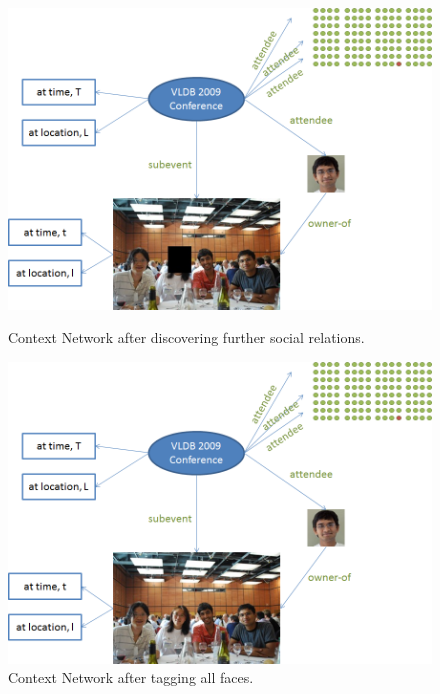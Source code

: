 \begin{figure}[h]
\begin{minipage}[b]{0.5\linewidth}
\centering
\includegraphics[width=\textwidth]{media/chapter4/stacktrace/vldb-network-7.png}
\caption{Context Network after discovering further social relations.}
\label{fig:vldb-network-7}
\end{minipage}
\hspace{0.5cm}
\begin{minipage}[b]{0.5\linewidth}
\centering
\includegraphics[width=\textwidth]{media/chapter4/stacktrace/vldb-network-8.png}
\caption{Context Network after tagging all faces.}
\label{fig:vldb-network-8}
\end{minipage}
\end{figure}

